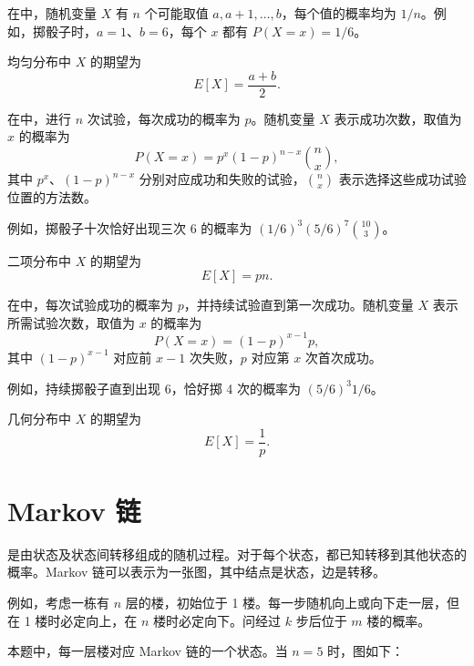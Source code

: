 在中，随机变量 $X$ 有 $n$ 个可能取值 $a,a+1,\ldots,b$，每个值的概率均为 $1/n$。例如，掷骰子时，$a=1$、$b=6$，每个 $x$ 都有 $P(X=x)=1/6$。

均匀分布中 $X$ 的期望为
\[E[X] = \frac{a+b}{2}.\]

在中，进行 $n$ 次试验，每次成功的概率为 $p$。随机变量 $X$ 表示成功次数，取值为 $x$ 的概率为
\[P(X=x)=p^x (1-p)^{n-x} {n \choose x},\]
其中 $p^x$、$(1-p)^{n-x}$ 分别对应成功和失败的试验，${n \choose x}$ 表示选择这些成功试验位置的方法数。

例如，掷骰子十次恰好出现三次 6 的概率为 $(1/6)^3 (5/6)^7 {10 \choose 3}$。

二项分布中 $X$ 的期望为
\[E[X] = pn.\]

在中，每次试验成功的概率为 $p$，并持续试验直到第一次成功。随机变量 $X$ 表示所需试验次数，取值为 $x$ 的概率为
\[P(X=x)=(1-p)^{x-1} p,\]
其中 $(1-p)^{x-1}$ 对应前 $x-1$ 次失败，$p$ 对应第 $x$ 次首次成功。

例如，持续掷骰子直到出现 6，恰好掷 4 次的概率为 $(5/6)^3 1/6$。

几何分布中 $X$ 的期望为
\[E[X]=\frac{1}{p}.\]

\section{Markov 链}


是由状态及状态间转移组成的随机过程。对于每个状态，都已知转移到其他状态的概率。Markov 链可以表示为一张图，其中结点是状态，边是转移。

例如，考虑一栋有 $n$ 层的楼，初始位于 1 楼。每一步随机向上或向下走一层，但在 1 楼时必定向上，在 $n$ 楼时必定向下。问经过 $k$ 步后位于 $m$ 楼的概率。

本题中，每一层楼对应 Markov 链的一个状态。当 $n=5$ 时，图如下：


